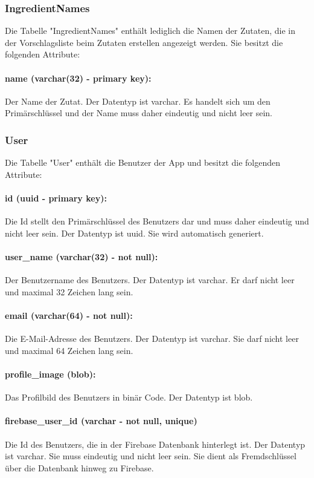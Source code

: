 \documentclass[parskip=full]{scrartcl}
\begin{document}
\subsubsection{IngredientNames}
Die Tabelle "IngredientNames" enthält lediglich die Namen der Zutaten, die in der Vorschlagsliste beim Zutaten erstellen angezeigt werden. Sie besitzt die folgenden Attribute:
\paragraph{name (varchar(32) - primary key):} Der Name der Zutat. Der Datentyp ist \Gls{varchar}. Es handelt sich um den Primärschlüssel und der Name muss daher eindeutig und nicht leer sein.
\newpage
\subsubsection{User}
Die Tabelle "User" enthält die Benutzer der App und besitzt die folgenden Attribute:
\paragraph{id (uuid - primary key):} Die Id stellt den Primärschlüssel des Benutzers dar und muss daher eindeutig und nicht leer sein. Der Datentyp ist \Gls{uuid}. Sie wird automatisch generiert.
\paragraph{user\_name (varchar(32) - not null):} Der Benutzername des Benutzers. Der Datentyp ist \Gls{varchar}. Er darf nicht leer und maximal 32 Zeichen lang sein.
\paragraph{email (varchar(64) - not null):} Die E-Mail-Adresse des Benutzers. Der Datentyp ist \Gls{varchar}. Sie darf nicht leer und maximal 64 Zeichen lang sein.
\paragraph{profile\_image (blob):} Das Profilbild des Benutzers in binär Code. Der Datentyp ist \Gls{blob}.
\paragraph{firebase\_user\_id (varchar - not null, unique)} Die Id des Benutzers, die in der Firebase Datenbank hinterlegt ist. Der Datentyp ist \Gls{varchar}. Sie muss eindeutig und nicht leer sein. Sie dient als Fremdschlüssel über die Datenbank hinweg zu Firebase.
\newpage
\end{document}

